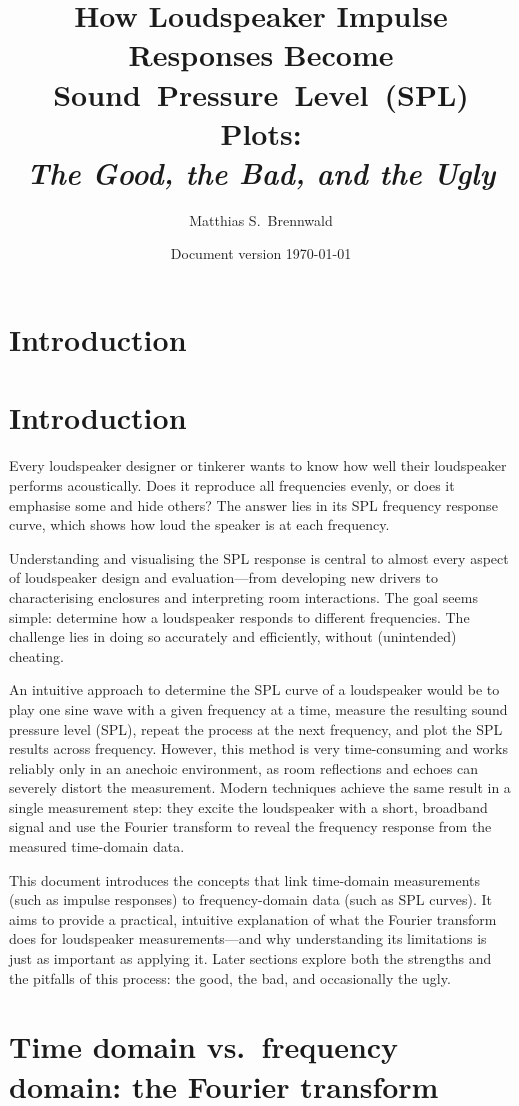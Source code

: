 \documentclass[12pt,a4paper]{article}
\title{How Loudspeaker Impulse Responses Become Sound~Pressure~Level~(SPL) Plots:\\[0.7em]\textit{The Good, the Bad, and the Ugly}}
\author{Matthias S.~Brennwald}
\date{Document version \today}
\begin{document}
\maketitle

\section{Introduction}
\section*{Introduction}

Every loudspeaker designer or tinkerer wants to know how well their loudspeaker performs acoustically. Does it reproduce all frequencies evenly, or does it emphasise some and hide others? The answer lies in its SPL frequency response curve, which shows how loud the speaker is at each frequency.

Understanding and visualising the SPL response is central to almost every aspect of loudspeaker design and evaluation—from developing new drivers to characterising enclosures and interpreting room interactions. The goal seems simple: determine how a loudspeaker responds to different frequencies. The challenge lies in doing so accurately and efficiently, without (unintended) cheating.

An intuitive approach to determine the SPL curve of a loudspeaker would be to play one sine wave with a given frequency at a time, measure the resulting sound pressure level (SPL), repeat the process at the next frequency, and plot the SPL results across frequency. However, this method is very time-consuming and works reliably only in an anechoic environment, as room reflections and echoes can severely distort the measurement. Modern techniques achieve the same result in a single measurement step: they excite the loudspeaker with a short, broadband signal and use the Fourier transform to reveal the frequency response from the measured time-domain data.

This document introduces the concepts that link time-domain measurements (such as impulse responses) to frequency-domain data (such as SPL curves). It aims to provide a practical, intuitive explanation of what the Fourier transform does for loudspeaker measurements—and why understanding its limitations is just as important as applying it. Later sections explore both the strengths and the pitfalls of this process: the good, the bad, and occasionally the ugly.


\section{Time domain vs.\ frequency domain: the Fourier transform}
\end{document}
